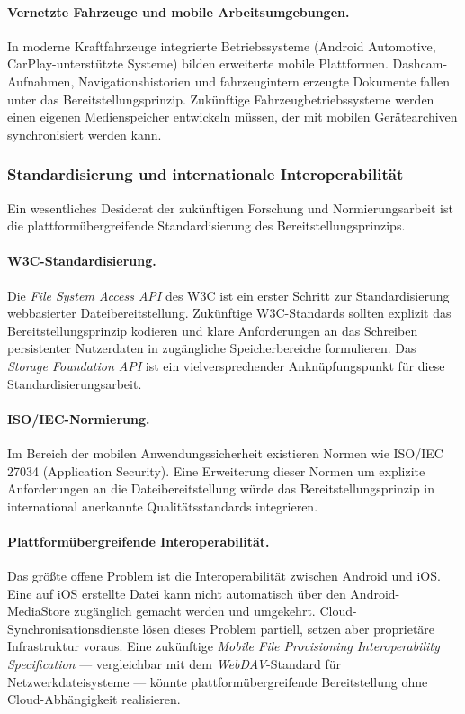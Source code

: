 ﻿\documentclass[12pt, a4paper]{article}
\begin{document}
\paragraph{Vernetzte Fahrzeuge und mobile Arbeitsumgebungen.}
In moderne Kraftfahrzeuge integrierte Betriebssysteme (Android Automotive,
CarPlay-unterstützte Systeme) bilden erweiterte mobile Plattformen. Dashcam-Aufnahmen,
Navigationshistorien und fahrzeugintern erzeugte Dokumente fallen unter das
Bereitstellungsprinzip. Zukünftige Fahrzeugbetriebssysteme werden einen eigenen
Medienspeicher entwickeln müssen, der mit mobilen Gerätearchiven synchronisiert
werden kann.

\subsubsection{Standardisierung und internationale Interoperabilität}

Ein wesentliches Desiderat der zukünftigen Forschung und Normierungsarbeit ist die
plattformübergreifende Standardisierung des Bereitstellungsprinzips.

\paragraph{W3C-Standardisierung.}
Die \emph{File System Access API} des W3C ist ein erster Schritt zur Standardisierung
webbasierter Dateibereitstellung. Zukünftige W3C-Standards sollten explizit das
Bereitstellungsprinzip kodieren und klare Anforderungen an das Schreiben persistenter
Nutzerdaten in zugängliche Speicherbereiche formulieren. Das \emph{Storage Foundation API}
ist ein vielversprechender Anknüpfungspunkt für diese Standardisierungsarbeit.

\paragraph{ISO/IEC-Normierung.}
Im Bereich der mobilen Anwendungssicherheit existieren Normen wie ISO/IEC\,27034
(Application Security). Eine Erweiterung dieser Normen um explizite Anforderungen an
die Dateibereitstellung würde das Bereitstellungsprinzip in international anerkannte
Qualitätsstandards integrieren.

\paragraph{Plattformübergreifende Interoperabilität.}
Das größte offene Problem ist die Interoperabilität zwischen Android und iOS. Eine
auf iOS erstellte Datei kann nicht automatisch über den Android-MediaStore zugänglich
gemacht werden und umgekehrt. Cloud-Synchronisationsdienste lösen dieses Problem
partiell, setzen aber proprietäre Infrastruktur voraus. Eine zukünftige
\emph{Mobile File Provisioning Interoperability Specification} --- vergleichbar mit
dem \emph{WebDAV}-Standard für Netzwerkdateisysteme --- könnte plattformübergreifende
Bereitstellung ohne Cloud-Abhängigkeit realisieren.
\end{document}
